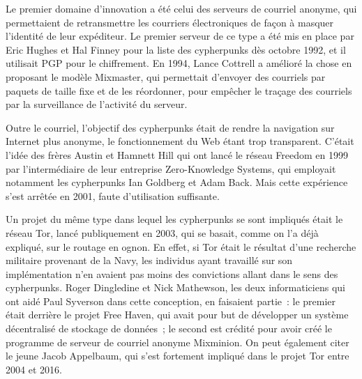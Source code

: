 Le premier domaine d'innovation a été celui des serveurs de courriel anonyme, qui permettaient de retransmettre les courriers électroniques de façon à masquer l'identité de leur expéditeur. Le premier serveur de ce type a été mis en place par Eric Hughes et Hal Finney pour la liste des cypherpunks dès octobre 1992, et il utilisait PGP pour le chiffrement. En 1994, Lance Cottrell a amélioré la chose en proposant le modèle Mixmaster, qui permettait d'envoyer des courriels par paquets de taille fixe et de les réordonner, pour empêcher le traçage des courriels par la surveillance de l'activité du serveur. %

Outre le courriel, l'objectif des cypherpunks était de rendre la navigation sur Internet plus anonyme, le fonctionnement du Web étant trop transparent. C'était l'idée des frères Austin et Hamnett Hill qui ont lancé le réseau Freedom en 1999 par l'intermédiaire de leur entreprise Zero-Knowledge Systems, qui employait notamment les cypherpunks Ian Goldberg et Adam Back. Mais cette expérience s'est arrêtée en 2001, faute d'utilisation suffisante.

Un projet du même type dans lequel les cypherpunks se sont impliqués était le réseau Tor, lancé publiquement en 2003, qui se basait, comme on l'a déjà expliqué, sur le routage en ognon. En effet, si Tor était le résultat d'une recherche militaire provenant de la Navy, les individus ayant travaillé sur son implémentation n'en avaient pas moins des convictions allant dans le sens des cypherpunks. Roger Dingledine et Nick Mathewson, les deux informaticiens qui ont aidé Paul Syverson dans cette conception, en faisaient partie~: le premier était derrière le projet Free Haven, qui avait pour but de développer un système décentralisé de stockage de données~; le second est crédité pour avoir créé le programme de serveur de courriel anonyme Mixminion. On peut également citer le jeune Jacob Appelbaum, qui s'est fortement impliqué dans le projet Tor entre 2004 et 2016.

